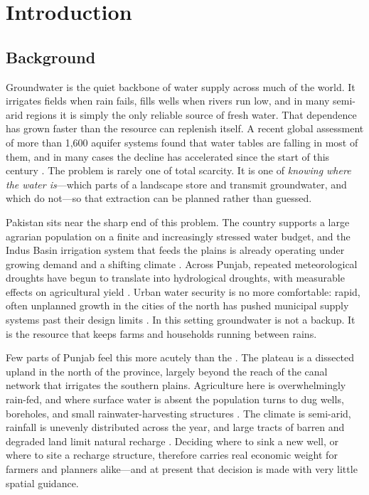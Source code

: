 \chapter{Introduction}
\label{ch:introduction}

\section{Background}
\label{sec:background}

Groundwater is the quiet backbone of water supply across much of the world.
It irrigates fields when rain fails, fills wells when rivers run low, and in
many semi-arid regions it is simply the only reliable source of fresh water.
That dependence has grown faster than the resource can replenish itself. A
recent global assessment of more than 1,600 aquifer systems found that water
tables are falling in most of them, and in many cases the decline has
accelerated since the start of this century \cite{jasechko2024gwdecline}. The
problem is rarely one of total scarcity. It is one of \emph{knowing where the
water is}---which parts of a landscape store and transmit groundwater, and
which do not---so that extraction can be planned rather than guessed.

Pakistan sits near the sharp end of this problem. The country supports a large
agrarian population on a finite and increasingly stressed water budget, and
the Indus Basin irrigation system that feeds the plains is already operating
under growing demand and a shifting climate \cite{ahmed2021indusbasin}.
Across Punjab, repeated meteorological droughts have begun to translate into
hydrological droughts, with measurable effects on agricultural yield
\cite{waseem2022drought,sarwar2022soandrought}. Urban water security is no
more comfortable: rapid, often unplanned growth in the cities of the north has
pushed municipal supply systems past their design limits
\cite{kamran2024watersecurity}. In this setting groundwater is not a backup.
It is the resource that keeps farms and households running between rains.

Few parts of Punjab feel this more acutely than the \studyarea{}. The plateau
is a dissected upland in the north of the province, largely beyond the reach
of the canal network that irrigates the southern plains. Agriculture here is
overwhelmingly rain-fed, and where surface water is absent the population turns
to dug wells, boreholes, and small rainwater-harvesting structures
\cite{ejaz2023soilwater,hafeez2025rwh}. The climate is semi-arid, rainfall is
unevenly distributed across the year, and large tracts of barren and degraded
land limit natural recharge \cite{khan2024afforestation}. Deciding where to
sink a new well, or where to site a recharge structure, therefore carries real
economic weight for farmers and planners alike---and at present that decision
is made with very little spatial guidance.

